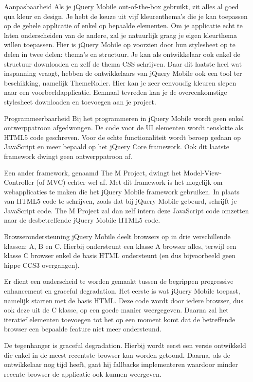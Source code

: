 Aanpasbaarheid
Als je jQuery Mobile out-of-the-box gebruikt, zit alles al goed qua kleur en design. Je hebt de keuze uit vijf kleurenthema's die je kan toepassen op de gehele applicatie of enkel op bepaalde elementen. Om je applicatie echt te laten onderscheiden van de andere, zal je natuurlijk graag je eigen kleurthema willen toepassen. Hier is jQuery Mobile op voorzien door hun stylesheet op te delen in twee delen: thema's en structuur. Je kan als ontwikkelaar ook enkel de structuur downloaden en zelf de thema CSS schrijven. Daar dit laatste heel wat inspanning vraagt, hebben de ontwikkelaars van jQuery Mobile ook een tool ter beschikking,  namelijk ThemeRoller. Hier kan je zeer eenvoudig kleuren slepen naar een voorbeeldapplicatie. Eenmaal tevreden kan je de overeenkomstige stylesheet downloaden en toevoegen aan je project.

Programmeerbaarheid
Bij het programmeren in jQuery Mobile wordt geen enkel ontwerppatroon afgedwongen. De code voor de UI elementen wordt tenslotte als HTML5 code geschreven. Voor de echte functionaliteit wordt beroep gedaan op JavaScript en meer bepaald op het jQuery Core framework. Ook dit laatste framework dwingt geen ontwerppatroon af.

Een ander framework, genaamd The M Project, dwingt het Model-View-Controller (of MVC) echter wel af. Met dit framework is het mogelijk om webapplicaties te maken die het jQuery Mobile framework gebruiken. In plaats van HTML5 code te schrijven, zoals dat bij jQuery Mobile gebeurd, schrijft je JavaScript code. The M Project zal dan zelf intern deze JavaScript code omzetten naar de desbetreffende jQuery Mobile HTML5 code.

Browserondersteuning
jQuery Mobile deelt browsers op in drie verschillende klassen: A, B en C. Hierbij ondersteunt een klasse A browser alles, terwijl een klasse C browser enkel de basis HTML ondersteunt (en dus bijvoorbeeld geen hippe CCS3 overgangen).

Er dient een onderscheid te worden gemaakt tussen de begrippen progressive enhancement en graceful degradation. Het eerste is wat jQuery Mobile toepast, namelijk starten met de basis HTML. Deze code wordt door iedere browser, dus ook deze uit de C klasse, op een goede manier weergegeven. Daarna zal het iteratief elementen toevoegen tot het op een moment komt dat de betreffende browser een bepaalde feature niet meer ondersteund.

De tegenhanger is graceful degradation. Hierbij wordt eerst een versie ontwikkeld die enkel in de meest recentste browser kan worden getoond. Daarna, als de ontwikkelaar nog tijd heeft, gaat hij fallbacks implementeren waardoor minder recente browser de applicatie ook kunnen weergeven.

